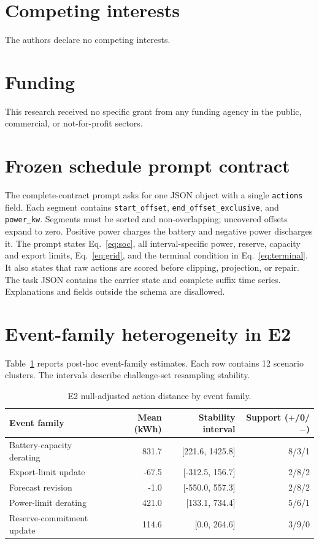 \documentclass[11pt]{article}
\begin{document}
\section*{Competing interests}
The authors declare no competing interests.

\section*{Funding}
This research received no specific grant from any funding agency in the public, commercial, or
not-for-profit sectors.

\appendix

\section{Frozen schedule prompt contract}
\label{app:prompt}

The complete-contract prompt asks for one JSON object with a single \texttt{actions} field. Each
segment contains \texttt{start\_offset}, \texttt{end\_offset\_exclusive}, and \texttt{power\_kw}.
Segments must be sorted and non-overlapping; uncovered offsets expand to zero. Positive power
charges the battery and negative power discharges it. The prompt states Eq.~\eqref{eq:soc}, all
interval-specific power, reserve, capacity and export limits, Eq.~\eqref{eq:grid}, and the
terminal condition in Eq.~\eqref{eq:terminal}. It also states that raw actions are scored before
clipping, projection, or repair. The task JSON contains the carrier state and complete suffix time
series. Explanations and fields outside the schema are disallowed.

\section{Event-family heterogeneity in E2}
\label{app:event}

Table~\ref{tab:event} reports post-hoc event-family estimates. Each row contains 12 scenario
clusters. The intervals describe challenge-set resampling stability.

\begin{table}[!htbp]
\centering
\caption{E2 null-adjusted action distance by event family.}
\label{tab:event}
\small
\begin{tabular}{@{}lrrr@{}}
\toprule
Event family & Mean (kWh) & Stability interval & Support ($+$/0/$-$) \\
\midrule
Battery-capacity derating & 831.7 & [221.6, 1425.8] & 8/3/1 \\
Export-limit update & -67.5 & [-312.5, 156.7] & 2/8/2 \\
Forecast revision & -1.0 & [-550.0, 557.3] & 2/8/2 \\
Power-limit derating & 421.0 & [133.1, 734.4] & 5/6/1 \\
Reserve-commitment update & 114.6 & [0.0, 264.6] & 3/9/0 \\
\bottomrule
\end{tabular}
\end{table}
\end{document}
